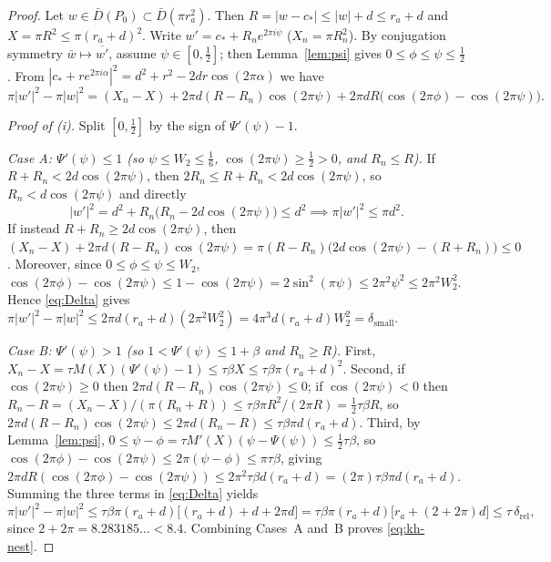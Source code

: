 \begin{proof}
Let $w\in\bar D(P_0)\subset\bar D(\pi r_a^2)$. Then $R=|w-c_*|\le|w|+d\le r_a+d$ and $X=\pi R^2\le\pi(r_a+d)^2$. Write
$w'=c_*+R_ne^{2\pi i\psi}$ ($X_n=\pi R_n^2$). By conjugation symmetry $\bar w\mapsto\overline{w'}$, assume
$\psi\in[0,\frac12]$; then Lemma~\ref{lem:psi} gives $0\le\phi\le\psi\le\frac12$. From
$|c_*+re^{2\pi i\alpha}|^2=d^2+r^2-2dr\cos(2\pi\alpha)$ we have
\begin{equation}\label{eq:Delta}
 \pi|w'|^2-\pi|w|^2 = (X_n-X) + 2\pi d(R-R_n)\cos(2\pi\psi) + 2\pi dR\bigl(\cos(2\pi\phi)-\cos(2\pi\psi)\bigr).
\end{equation}

\emph{Proof of (i).} Split $[0,\frac12]$ by the sign of $\Psi'(\psi)-1$.

\emph{Case A: $\Psi'(\psi)\le1$ (so $\psi\le W_2\le\frac16$, $\cos(2\pi\psi)\ge\frac12>0$, and $R_n\le R$).}
If $R+R_n<2d\cos(2\pi\psi)$, then $2R_n\le R+R_n<2d\cos(2\pi\psi)$, so $R_n<d\cos(2\pi\psi)$ and directly
\[
 |w'|^2 = d^2 + R_n\bigl(R_n-2d\cos(2\pi\psi)\bigr) \le d^2 \implies \pi|w'|^2\le\pi d^2.
\]
If instead $R+R_n\ge 2d\cos(2\pi\psi)$, then
$(X_n-X)+2\pi d(R-R_n)\cos(2\pi\psi)=\pi(R-R_n)\bigl(2d\cos(2\pi\psi)-(R+R_n)\bigr)\le0$. Moreover, since
$0\le\phi\le\psi\le W_2$, $\cos(2\pi\phi)-\cos(2\pi\psi)\le 1-\cos(2\pi\psi)=2\sin^2(\pi\psi)\le 2\pi^2\psi^2\le 2\pi^2W_2^2$.
Hence \eqref{eq:Delta} gives $\pi|w'|^2-\pi|w|^2\le 2\pi d(r_a+d)(2\pi^2W_2^2)=4\pi^3 d(r_a+d)W_2^2=\delta_{\mathrm{small}}$.

\emph{Case B: $\Psi'(\psi)>1$ (so $1<\Psi'(\psi)\le 1+\beta$ and $R_n\ge R$).}
First, $X_n-X=\tau M(X)(\Psi'(\psi)-1)\le\tau\beta X\le\tau\beta\pi(r_a+d)^2$. Second, if $\cos(2\pi\psi)\ge0$ then
$2\pi d(R-R_n)\cos(2\pi\psi)\le0$; if $\cos(2\pi\psi)<0$ then
$R_n-R=(X_n-X)/(\pi(R_n+R))\le\tau\beta\pi R^2/(2\pi R)=\frac12\tau\beta R$, so
$2\pi d(R-R_n)\cos(2\pi\psi)\le 2\pi d(R_n-R)\le\tau\beta\pi d(r_a+d)$. Third, by Lemma~\ref{lem:psi},
$0\le\psi-\phi=\tau M'(X)(\psi-\Psi(\psi))\le\frac12\tau\beta$, so
$\cos(2\pi\phi)-\cos(2\pi\psi)\le 2\pi(\psi-\phi)\le\pi\tau\beta$, giving
$2\pi dR(\cos(2\pi\phi)-\cos(2\pi\psi))\le 2\pi^2\tau\beta d(r_a+d)=(2\pi)\tau\beta\pi d(r_a+d)$. Summing the three
terms in \eqref{eq:Delta} yields
\[
 \pi|w'|^2-\pi|w|^2 \le \tau\beta\pi(r_a+d)\bigl[(r_a+d)+d+2\pi d\bigr]
 = \tau\beta\pi(r_a+d)\bigl[r_a+(2+2\pi)d\bigr] \le \tau\,\delta_{\mathrm{rel}},
\]
since $2+2\pi=8.283185\dots<8.4$. Combining Cases~A and~B proves \eqref{eq:kh-nest}.


\end{proof}
